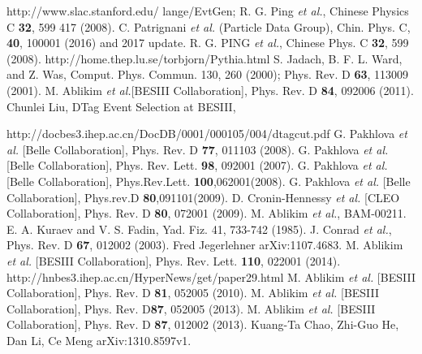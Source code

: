 \documentclass[aps,preprint,tightenlines,superscriptaddress,showpacs,byrevtex,amsmath,amssymb,nofloatfix]{revtex4}
\begin{document}
\begin{thebibliography}{**}
 http://www.slac.stanford.edu/ lange/EvtGen; R. G. Ping {\em et al.}, Chinese Physics C {\bf 32}, 599 417 (2008).
 C. Patrignani {\em et al.} (Particle Data Group), Chin. Phys. C, {\bf 40}, 100001 (2016) and 2017 update.
 R. G. PING {\em et al.}, Chinese Phys. C {\bf 32}, 599 (2008).
 http://home.thep.lu.se/torbjorn/Pythia.html
 S. Jadach, B. F. L. Ward, and Z. Was, Comput. Phys. Commun. 130, 260 (2000); Phys. Rev. D {\bf 63}, 113009 (2001).
 M. Ablikim {\em et al.}[BESIII Collaboration], Phys. Rev. D {\bf 84}, 092006 (2011).
 Chunlei Liu, DTag Event Selection at BESIII,\par http://docbes3.ihep.ac.cn/DocDB/0001/000105/004/dtagcut.pdf
 G. Pakhlova {\em et al.} [Belle Collaboration], Phys. Rev. D {\bf 77}, 011103 (2008).
 G. Pakhlova {\em et al.} [Belle Collaboration], Phys. Rev. Lett. {\bf 98}, 092001 (2007).
 G. Pakhlova {\em et al.} [Belle Collaboration], Phys.Rev.Lett. {\bf 100},062001(2008).
 G. Pakhlova {\em et al.} [Belle Collaboration], Phys.rev.D {\bf 80},091101(2009).
 D. Cronin-Hennessy {\em et al.} [CLEO Collaboration], Phys. Rev. D {\bf 80}, 072001 (2009).
 M. Ablikim {\em et al.}, BAM-00211.
 E. A. Kuraev and V. S. Fadin, Yad. Fiz. 41, 733-742 (1985).
 J. Conrad {\em et al.}, Phys. Rev. D {\bf 67}, 012002 (2003).
 Fred Jegerlehner arXiv:1107.4683.
M. Ablikim {\em et al.} [BESIII Collaboration], Phys. Rev. Lett. {\bf 110}, 022001 (2014).
http://hnbes3.ihep.ac.cn/HyperNews/get/paper29.html
M. Ablikim {\em et al.} [BESIII Collaboration], Phys. Rev. D {\bf 81}, 052005 (2010).
 M. Ablikim {\em et al.} [BESIII Collaboration], Phys. Rev. D{\bf 87}, 052005 (2013).
M. Ablikim {\em et al.} [BESIII Collaboration], Phys. Rev. D {\bf 87}, 012002 (2013).
 Kuang-Ta Chao, Zhi-Guo He, Dan Li, Ce Meng 	arXiv:1310.8597v1.


\end{thebibliography}

\newpage
\end{document}
